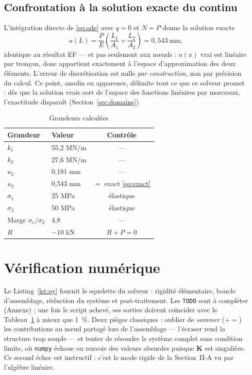 \documentclass[10pt,journal]{IEEEtran}
\begin{document}
\subsection{Confrontation à la solution exacte du continu}
L'intégration directe de \eqref{eq:ode} avec $q=0$ et $N=P$ donne la solution exacte
\begin{equation}
u(L) = \frac{P}{E}\left(\frac{L_1}{A_1} + \frac{L_2}{A_2}\right) = 0{,}543~\text{mm},
\label{eq:exact}
\end{equation}
identique au résultat EF --- et pas seulement aux n\oe{}uds : $u(x)$ vrai est linéaire par tronçon, donc appartient exactement à l'espace d'approximation des deux éléments. L'erreur de discrétisation est nulle \emph{par construction}, non par précision du calcul. Ce point, anodin en apparence, délimite tout ce que ce solveur promet : dès que la solution vraie sort de l'espace des fonctions linéaires par morceaux, l'exactitude disparaît (Section~\ref{sec:domaine}).

\begin{table}[!t]
\caption{Grandeurs calculées}
\label{tab:res}
\centering
\begin{tabular}{@{}llc@{}}
\toprule
Grandeur & Valeur & Contrôle \\
\midrule
$k_1$ & 55,2 MN/m & --- \\
$k_2$ & 27,6 MN/m & --- \\
$u_2$ & 0,181 mm & --- \\
$u_3$ & 0,543 mm & $=$ exact \eqref{eq:exact} \\
$\sigma_1$ & 25 MPa & élastique \\
$\sigma_2$ & 50 MPa & élastique \\
Marge $\sigma_e/\sigma_2$ & 4,8 & --- \\
$R$ & $-10$ kN & $R+P=0$ \\
\bottomrule
\end{tabular}
\end{table}

\section{Vérification numérique}
Le Listing~\ref{lst:py} fournit le squelette du solveur : rigidité élémentaire, boucle d'assemblage, réduction du système et post-traitement. Les \texttt{TODO} sont à compléter (Annexe) ; une fois le script achevé, ses sorties doivent coïncider avec le Tableau~\ref{tab:res} à mieux que 1~\%. Deux pièges classiques : oublier de \emph{sommer} ($\mathrel{+}=$) les contributions au n\oe{}ud partagé lors de l'assemblage --- l'écraser rend la structure trop souple --- et tenter de résoudre le système complet sans condition limite, où \texttt{numpy} échoue ou renvoie des valeurs absurdes puisque $\mathbf{K}$ est singulière. Ce second échec est instructif : c'est le mode rigide de la Section~II-A vu par l'algèbre linéaire.
\end{document}
